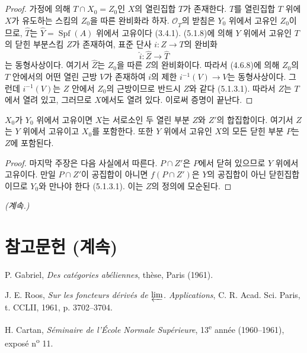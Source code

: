 \begin{proof}
가정에 의해 $T\cap X_0=Z_0$인 $X$의 열린집합 $T$가 존재한다.
$\widehat T$를 열린집합 $T$ 위에 $X$가 유도하는 스킴의 $Z_0$을
따른 완비화라 하자. $\mathcal O_{\widehat T}$의 받침은 $Y_0$
위에서 고유인 $Z_0$이므로, $\widehat T$는
$\widehat Y=\operatorname{Spf}(A)$ 위에서 고유이다 (3.4.1).
(5.1.8)에 의해 $Y$ 위에서 고유인 $T$의 닫힌 부분스킴 $Z$가
존재하여, 표준 단사 $i:Z\to T$의 완비화
\[
\widehat i:\widehat Z\to\widehat T
\]
는 동형사상이다. 여기서 $\widehat Z$는 $Z_0$을 따른 $Z$의
완비화이다. 따라서 (4.6.8)에 의해 $Z_0$의 $T$ 안에서의 어떤
열린 근방 $V$가 존재하여 $i$의 제한
$i^{-1}(V)\to V$는 동형사상이다. 그런데 $i^{-1}(V)$는 $Z$ 안에서
$Z_0$의 근방이므로 반드시 $Z$와 같다 (5.1.3.1). 따라서 $Z$는
$T$에서 열려 있고, 그러므로 $X$에서도 열려 있다. 이로써 증명이
끝난다.
\end{proof}

\begin{corollary}[5.5.2]
\label{III.5.5.2-fr}
$X_0$가 $Y_0$ 위에서 고유이면 $X$는 서로소인 두 열린 부분
$Z$와 $Z'$의 합집합이다. 여기서 $Z$는 $Y$ 위에서 고유이고
$X_0$를 포함한다. 또한 $Y$ 위에서 고유인 $X$의 모든 닫힌 부분
$P$는 $Z$에 포함된다.
\end{corollary}

\begin{proof}
마지막 주장은 다음 사실에서 따른다. $P\cap Z'$은 $P$에서 닫혀
있으므로 $Y$ 위에서 고유이다. 만일 $P\cap Z'$이 공집합이 아니면
$f(P\cap Z')$은 $Y$의 공집합이 아닌 닫힌집합이므로 $Y_0$와
만나야 한다 (5.1.3.1). 이는 $Z$의 정의에 모순된다.
\end{proof}

\begin{flushright}
\emph{(계속.)}
\end{flushright}

\clearpage
\thispagestyle{empty}
\null
\clearpage
\thispagestyle{plain}


\section*{참고문헌 (계속)}

\begin{flushleft}
[27] P. Gabriel, \emph{Des catégories abéliennes}, thèse, Paris (1961).

\medskip
[28] J. E. Roos, \emph{Sur les foncteurs dérivés de $\varprojlim$.
Applications}, C. R. Acad. Sci. Paris, t. CCLII, 1961, p. 3702--3704.

\medskip
[29] H. Cartan, \emph{Séminaire de l'École Normale Supérieure},
13\textsuperscript{e} année (1960--1961), exposé n\textsuperscript{o} 11.
\end{flushleft}

